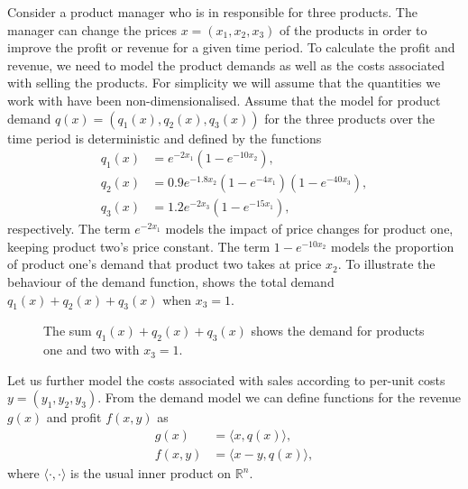\documentclass[main.tex]{subfiles}
\begin{document}
Consider a product manager who is in responsible for three products.
The manager can change the prices
$x=(x_1,x_2,x_3)$
of the products in order to improve the profit or revenue for a given
time period.
To calculate the profit and revenue, we need to model the product
demands as well as the costs associated with selling the products.
For simplicity we will assume that the quantities we work with have
been non-dimensionalised.
Assume that the model for product demand $q(x)=(q_1(x),q_2(x),q_3(x))$
for the three products over the time period is
deterministic and defined by the functions
\begin{align}
  q_1(x) &= e^{-2x_1}(1-e^{-10x_2}),\\
  q_2(x) &= 0.9e^{-1.8x_2}(1-e^{-4x_1})(1-e^{-40x_3}),\\
  q_3(x) &= 1.2e^{-2x_3}(1-e^{-15x_1}),
\end{align}
respectively.
The term $e^{-2x_1}$  models the impact of price
changes for product one, keeping product two's price constant.
The term $1-e^{-10x_2}$ models the proportion of product one's
demand that product two takes at price $x_2$.
To illustrate the behaviour of the demand function,
 shows the total demand $q_1(x)+q_2(x)+q_3(x)$ when
$x_3=1$.
\begin{figure}[htbp]
  \centering
  \caption{The sum $q_1(x)+q_2(x)+q_3(x)$ shows the demand for products one
    and two with $x_3=1$.
  }\label{fig:total_volume_2d}
\end{figure}

Let us further model the costs associated with sales according to per-unit
costs $y=(y_1,y_2,y_3)$.
From the demand model we can define functions for the revenue $g(x)$ and profit
$f(x,y)$ as
\begin{align}
  g(x)&=\langle x,q(x) \rangle,\\
  f(x,y)
      &=\langle x-y,q(x) \rangle,
\end{align}
where $\langle \cdot,\cdot \rangle$ is the usual inner product on
$\mathbb{R}^n$.
\end{document}
